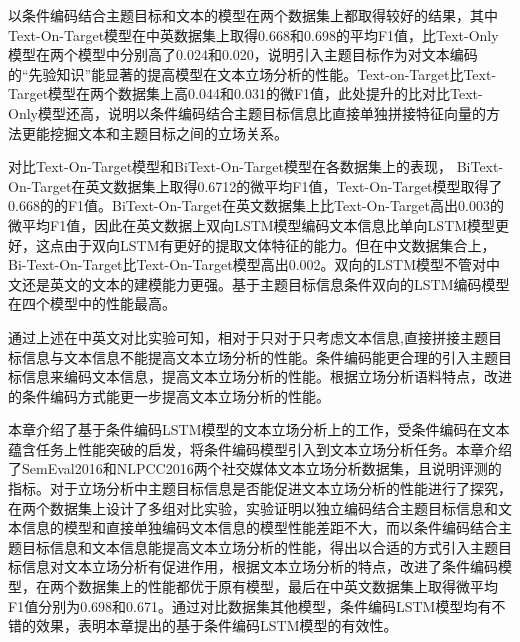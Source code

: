 以条件编码结合主题目标和文本的模型在两个数据集上都取得较好的结果，其中Text-On-Target模型在中英数据集上取得0.668和0.698的平均F1值，比Text-Only模型在两个模型中分别高了0.024和0.020，说明引入主题目标作为对文本编码的“先验知识”能显著的提高模型在文本立场分析的性能。Text-on-Target比Text-Target模型在两个数据集上高0.044和0.031的微F1值，此处提升的比对比Text-Only模型还高，说明以条件编码结合主题目标信息比直接单独拼接特征向量的方法更能挖掘文本和主题目标之间的立场关系。

对比Text-On-Target模型和BiText-On-Target模型在各数据集上的表现， BiText-On-Target在英文数据集上取得0.6712的微平均F1值，Text-On-Target模型取得了0.668的的F1值。BiText-On-Target在英文数据集上比Text-On-Target高出0.003的微平均F1值，因此在英文数据上双向LSTM模型编码文本信息比单向LSTM模型更好，这点由于双向LSTM有更好的提取文体特征的能力。但在中文数据集合上，Bi-Text-On-Target比Text-On-Target模型高出0.002。双向的LSTM模型不管对中文还是英文的文本的建模能力更强。基于主题目标信息条件双向的LSTM编码模型在四个模型中的性能最高。

通过上述在中英文对比实验可知，相对于只对于只考虑文本信息,直接拼接主题目标信息与文本信息不能提高文本立场分析的性能。条件编码能更合理的引入主题目标信息来编码文本信息，提高文本立场分析的性能。根据立场分析语料特点，改进的条件编码方式能更一步提高文本立场分析的性能。

本章介绍了基于条件编码LSTM模型的文本立场分析上的工作，受条件编码在文本蕴含任务上性能突破的启发，将条件编码模型引入到文本立场分析任务。本章介绍了SemEval2016和NLPCC2016两个社交媒体文本立场分析数据集，且说明评测的指标。对于立场分析中主题目标信息是否能促进文本立场分析的性能进行了探究，在两个数据集上设计了多组对比实验，实验证明以独立编码结合主题目标信息和文本信息的模型和直接单独编码文本信息的模型性能差距不大，而以条件编码结合主题目标信息和文本信息能提高文本立场分析的性能，得出以合适的方式引入主题目标信息对文本立场分析有促进作用，根据文本立场分析的特点，改进了条件编码模型，在两个数据集上的性能都优于原有模型，最后在中英文数据集上取得微平均F1值分别为0.698和0.671。通过对比数据集其他模型，条件编码LSTM模型均有不错的效果，表明本章提出的基于条件编码LSTM模型的有效性。

